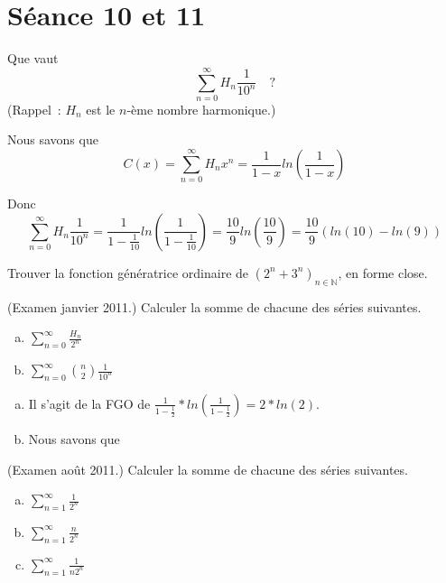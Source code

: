 
\section{Séance 10 et 11}

\begin{exo}
Que vaut
\[
\sum_{n=0}^\infty H_n \frac{1}{10^n}\quad ?
\]
(Rappel~: $H_n$ est le $n$-\`eme nombre harmonique.)
\end{exo}

Nous savons que \[ C(x) = \sum_{n=0}^\infty H_n x^n = \frac{1}{1-x} ln(\frac{1}{1-x}) \]

Donc \[ \sum_{n=0}^\infty H_n \frac{1}{10^n} = \frac{1}{1-\frac{1}{10}} ln(\frac{1}{1-\frac{1}{10}}) = \frac{10}{9} ln(\frac{10}{9}) = \frac{10}{9} (ln(10) - ln(9)) \]

\begin{exo}
Trouver la fonction g\'en\'eratrice ordinaire de $(2^n + 3^n)_{n \in \mathbb{N}}$, en forme close.
\end{exo}


\begin{exo} (Examen janvier 2011.) 
Calculer la somme de chacune des s\'eries suivantes.
%
\begin{enumerate}[a)]
\item $\displaystyle \sum_{n=0}^\infty \frac{H_n}{2^n}$
\item $\displaystyle \sum_{n=0}^\infty {n \choose 2} \frac{1}{10^n}$
\end{enumerate}
\end{exo}

\begin{enumerate}[a)]
\item Il s'agit de la FGO de $\frac{1}{1-\frac{1}{2}}*ln(\frac{1}{1-\frac{1}{2}}) = 2*ln(2)$.

\item Nous savons que 
\end{enumerate}


\begin{exo} (Examen ao\^ut 2011.) 
Calculer la somme de chacune des s\'eries suivantes.
%
\begin{enumerate}[a)]
\item $\displaystyle \sum_{n=1}^\infty \frac{1}{2^n}$
\item $\displaystyle \sum_{n=1}^\infty \frac{n}{2^n}$
\item $\displaystyle \sum_{n=1}^\infty \frac{1}{n 2^n}$ 
\end{enumerate}
\end{exo}

